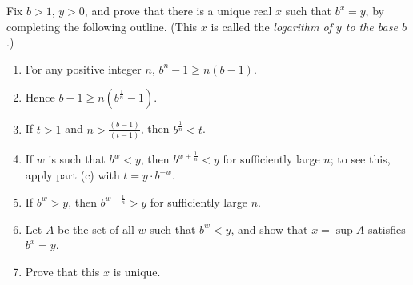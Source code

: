 \begin{exercise}
	Fix $b > 1$, $y > 0$, and prove that there is a unique real $x$ such that $b^x = y$, by completing the following outline. (This $x$ is called the \textit{logarithm of $y$ to the base $b$}.)
	\renewcommand{\labelenumi}{(\alph{enumi})}
	\begin{enumerate}
		\item For any positive integer $n$, $b^n - 1 \geq n \left( b - 1 \right)$.
		\item Hence $b - 1 \geq n \left( b^{\frac{1}{n}} - 1 \right)$.
		\item If $t > 1$ and $n > \frac{\left( b - 1 \right)}{\left( t - 1 \right)}$, then $b^{\frac{1}{n}} < t$.
		\item If $w$ is such that $b^w < y$, then $b^{w + \frac{1}{n}} < y$ for sufficiently large $n$; to see this, apply part (c) with $t = y \cdot b^{-w}$.
		\item If $b^w > y$, then $b^{w - \frac{1}{n}} > y$ for sufficiently large $n$.
		\item Let $A$ be the set of all $w$ such that $b^w < y$, and show that $x = \sup A$ satisfies $b^x = y$.
		\item Prove that this $x$ is unique.
	\end{enumerate}
\end{exercise}
